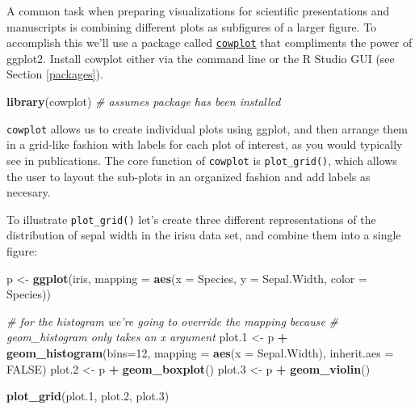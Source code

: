 \documentclass[]{book}
\newenvironment{Shaded}{\begin{snugshade}}{\end{snugshade}}
\newcommand{\CommentTok}[1]{\textcolor[rgb]{0.56,0.35,0.01}{\textit{#1}}}
\newcommand{\DataTypeTok}[1]{\textcolor[rgb]{0.13,0.29,0.53}{#1}}
\newcommand{\DecValTok}[1]{\textcolor[rgb]{0.00,0.00,0.81}{#1}}
\newcommand{\FloatTok}[1]{\textcolor[rgb]{0.00,0.00,0.81}{#1}}
\newcommand{\KeywordTok}[1]{\textcolor[rgb]{0.13,0.29,0.53}{\textbf{#1}}}
\newcommand{\NormalTok}[1]{#1}
\newcommand{\OperatorTok}[1]{\textcolor[rgb]{0.81,0.36,0.00}{\textbf{#1}}}
\newcommand{\OtherTok}[1]{\textcolor[rgb]{0.56,0.35,0.01}{#1}}
\newcommand{\StringTok}[1]{\textcolor[rgb]{0.31,0.60,0.02}{#1}}
\theoremstyle{definition}
\theoremstyle{definition}
\theoremstyle{definition}
\theoremstyle{remark}
\begin{document}
A common task when preparing visualizations for scientific presentations
and manuscripts is combining different plots as subfigures of a larger
figure. To accomplish this we'll use a package called
\href{https://cran.r-project.org/web/packages/cowplot/index.html}{\texttt{cowplot}}
that compliments the power of ggplot2. Install cowplot either via the
command line or the R Studio GUI (see Section \ref{packages}).

\begin{Shaded}
\begin{Highlighting}[]
\KeywordTok{library}\NormalTok{(cowplot) }\CommentTok{# assumes package has been installed}
\end{Highlighting}
\end{Shaded}

\texttt{cowplot} allows us to create individual plots using ggplot, and
then arrange them in a grid-like fashion with labels for each plot of
interest, as you would typically see in publications. The core function
of \texttt{cowplot} is \texttt{plot\_grid()}, which allows the user to
layout the sub-plots in an organized fashion and add labels as necesary.

To illustrate \texttt{plot\_grid()} let's create three different
representations of the distribution of sepal width in the irisu data
set, and combine them into a single figure:

\begin{Shaded}
\begin{Highlighting}[]
\NormalTok{p <-}\StringTok{ }\KeywordTok{ggplot}\NormalTok{(iris, }
            \DataTypeTok{mapping =} \KeywordTok{aes}\NormalTok{(}\DataTypeTok{x =}\NormalTok{ Species, }\DataTypeTok{y =}\NormalTok{ Sepal.Width, }\DataTypeTok{color =}\NormalTok{ Species))}

\CommentTok{# for the histogram we're going to override the mapping because}
\CommentTok{# geom_histogram only takes an x argument}
\NormalTok{plot}\FloatTok{.1}\NormalTok{ <-}\StringTok{ }\NormalTok{p }\OperatorTok{+}\StringTok{ }
\StringTok{  }\KeywordTok{geom_histogram}\NormalTok{(}\DataTypeTok{bins=}\DecValTok{12}\NormalTok{,}
                 \DataTypeTok{mapping =} \KeywordTok{aes}\NormalTok{(}\DataTypeTok{x =}\NormalTok{ Sepal.Width), }\DataTypeTok{inherit.aes =} \OtherTok{FALSE}\NormalTok{)}
\NormalTok{plot}\FloatTok{.2}\NormalTok{ <-}\StringTok{ }\NormalTok{p }\OperatorTok{+}\StringTok{ }\KeywordTok{geom_boxplot}\NormalTok{() }
\NormalTok{plot}\FloatTok{.3}\NormalTok{ <-}\StringTok{ }\NormalTok{p }\OperatorTok{+}\StringTok{ }\KeywordTok{geom_violin}\NormalTok{()}

\KeywordTok{plot_grid}\NormalTok{(plot}\FloatTok{.1}\NormalTok{, plot}\FloatTok{.2}\NormalTok{, plot}\FloatTok{.3}\NormalTok{)}
\end{Highlighting}
\end{Shaded}
\end{document}
